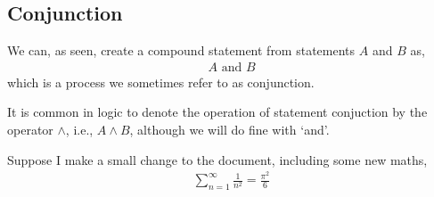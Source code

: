 \subsection{Conjunction}
We can, as seen, create a compound statement from statements $ A $ and $ B $ as,
\begin{align*}
	A \text{ and } B
\end{align*}
which is a process we sometimes refer to as conjunction.

\begin{notation}
	It is common in logic to denote the operation of statement conjuction by the operator $ \land $, i.e., $ A \land B $, although we will do fine with `and'.
\end{notation}

Suppose I make a small change to the document, including some new maths,
\begin{align*}
	\sum_{n=1}^{\infty}{\frac{1}{n^{2}}} = \frac{\pi^{2}}{6}
\end{align*}
